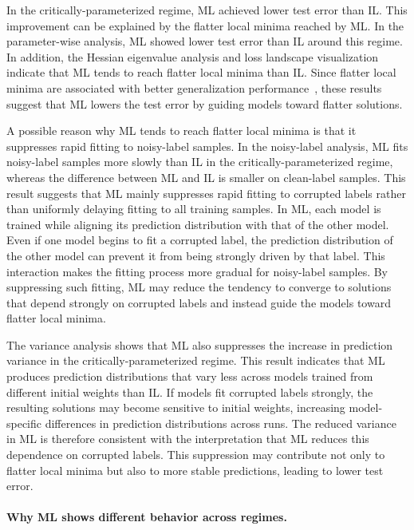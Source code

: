 \documentclass[dvipdfmx]{nolta}        %
\begin{document}
In the critically-parameterized regime, ML achieved lower test error than IL. This improvement can be explained by the flatter local minima reached by ML. In the parameter-wise analysis, ML showed lower test error than IL around this regime. In addition, the Hessian eigenvalue analysis and loss landscape visualization indicate that ML tends to reach flatter local minima than IL. Since flatter local minima are associated with better generalization performance~\cite{hochreiter_flat_1997}, these results suggest that ML lowers the test error by guiding models toward flatter solutions.

A possible reason why ML tends to reach flatter local minima is that it suppresses rapid fitting to noisy-label samples. In the noisy-label analysis, ML fits noisy-label samples more slowly than IL in the critically-parameterized regime, whereas the difference between ML and IL is smaller on clean-label samples. This result suggests that ML mainly suppresses rapid fitting to corrupted labels rather than uniformly delaying fitting to all training samples. In ML, each model is trained while aligning its prediction distribution with that of the other model. Even if one model begins to fit a corrupted label, the prediction distribution of the other model can prevent it from being strongly driven by that label. This interaction makes the fitting process more gradual for noisy-label samples. By suppressing such fitting, ML may reduce the tendency to converge to solutions that depend strongly on corrupted labels and instead guide the models toward flatter local minima.

The variance analysis shows that ML also suppresses the increase in prediction variance in the critically-parameterized regime. This result indicates that ML produces prediction distributions that vary less across models trained from different initial weights than IL. If models fit corrupted labels strongly, the resulting solutions may become sensitive to initial weights, increasing model-specific differences in prediction distributions across runs. The reduced variance in ML is therefore consistent with the interpretation that ML reduces this dependence on corrupted labels. This suppression may contribute not only to flatter local minima but also to more stable predictions, leading to lower test error.

\paragraph{Why ML shows different behavior across regimes.}
\end{document}
